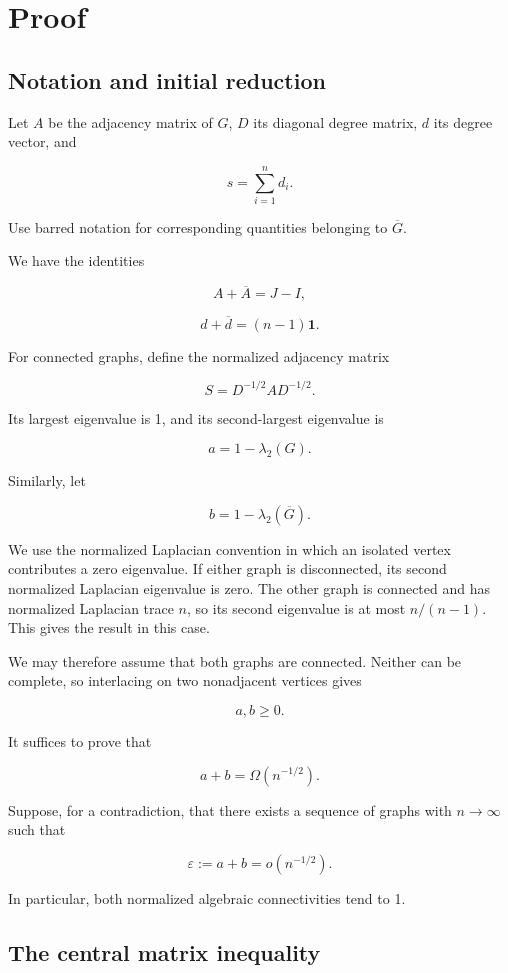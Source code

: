 \documentclass[11pt]{article}
\begin{document}
\section{Proof}

\subsection{Notation and initial reduction}

Let \(A\) be the adjacency matrix of \(G\), \(D\) its diagonal degree matrix, \(d\) its degree vector, and

\[
s=\sum_{i=1}^n d_i.
\]

Use barred notation for corresponding quantities belonging to \(\overline G\).

We have the identities

\[
A+\overline A=J-I,
\]

\[
d+\overline d=(n-1)\mathbf1.
\]

For connected graphs, define the normalized adjacency matrix

\[
S=D^{-1/2}AD^{-1/2}.
\]

Its largest eigenvalue is 1, and its second-largest eigenvalue is

\[
a=1-\lambda_2(G).
\]

Similarly, let

\[
b=1-\lambda_2(\overline G).
\]

We use the normalized Laplacian convention in which an isolated vertex contributes a zero eigenvalue. If either graph is disconnected, its second normalized Laplacian eigenvalue is zero. The other graph is connected and has normalized Laplacian trace $n$, so its second eigenvalue is at most $n/(n-1)$. This gives the result in this case.

We may therefore assume that both graphs are connected. Neither can be complete, so interlacing on two nonadjacent vertices gives

\[
a,b\geq0.
\]

It suffices to prove that

\[
a+b=\Omega(n^{-1/2}).
\]

Suppose, for a contradiction, that there exists a sequence of graphs with \(n\to\infty\) such that

\[
\varepsilon:=a+b=o(n^{-1/2}).
\tag{1}
\]

In particular, both normalized algebraic connectivities tend to 1.

\subsection{The central matrix inequality}
\end{document}
